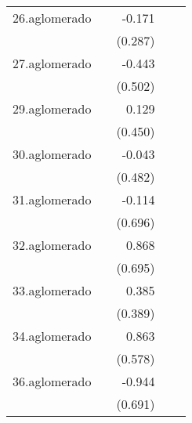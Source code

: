 {\begin{longtable}{l*{4}{D{.}{.}{-1}}}
\addlinespace
26.aglomerado&                     &      -0.171         &                     &                     \\
            &                     &     (0.287)         &                     &                     \\
\addlinespace
27.aglomerado&                     &      -0.443         &                     &                     \\
            &                     &     (0.502)         &                     &                     \\
\addlinespace
29.aglomerado&                     &       0.129         &                     &                     \\
            &                     &     (0.450)         &                     &                     \\
\addlinespace
30.aglomerado&                     &      -0.043         &                     &                     \\
            &                     &     (0.482)         &                     &                     \\
\addlinespace
31.aglomerado&                     &      -0.114         &                     &                     \\
            &                     &     (0.696)         &                     &                     \\
\addlinespace
32.aglomerado&                     &       0.868         &                     &                     \\
            &                     &     (0.695)         &                     &                     \\
\addlinespace
33.aglomerado&                     &       0.385         &                     &                     \\
            &                     &     (0.389)         &                     &                     \\
\addlinespace
34.aglomerado&                     &       0.863         &                     &                     \\
            &                     &     (0.578)         &                     &                     \\
\addlinespace
36.aglomerado&                     &      -0.944         &                     &                     \\
            &                     &     (0.691)         &                     &                     \\

\end{longtable}}
